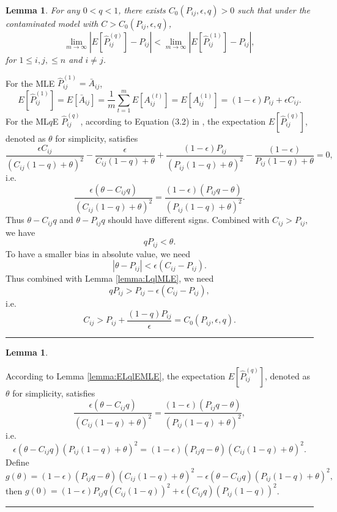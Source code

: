 \documentclass[a4paper]{article}
\newenvironment{proof}{{\bf Proof:  }}{\hfill\rule{2mm}{2mm}}
\newtheorem{lemma}[fact]{Lemma}
\begin{document}
\begin{lemma}%
For any $0 < q < 1$, there exists $C_0(P_{ij}, \epsilon, q) > 0$ such that under the contaminated model with $C > C_0(P_{ij}, \epsilon, q)$,
\[
	\lim_{m \to \infty} \left| E[\hat{P}^{(q)}_{ij}] - P_{ij} \right| < 
    \lim_{m \to \infty} \left| E[\hat{P}^{(1)}_{ij}] - P_{ij} \right|,
\]
for $1 \le i, j, \le n$ and $i \ne j$.
\end{lemma}
\label{lemma:ELqlEMLE}
\begin{proof}
For the MLE $\hat{P}^{(1)}_{ij} = \bar{A}_{ij}$,
\[
	E[\hat{P}^{(1)}_{ij}] = E[\bar{A}_{ij}]
    = \frac{1}{m} \sum_{t = 1}^m E[A_{ij}^{(t)}]
    = E[A_{ij}^{(1)}]
    = (1-\epsilon) P_{ij} + \epsilon C_{ij}.
\]
For the ML$q$E $\hat{P}^{(q)}_{ij}$, according to Equation (3.2) in \cite{ferrari2010}, the expectation $E[\hat{P}^{(q)}_{ij}]$, denoted as $\theta$ for simplicity, satisfies
\[
\frac{\epsilon C_{ij}}{(C_{ij}(1-q) + \theta)^2} - \frac{\epsilon}{C_{ij}(1-q) + \theta}
+\frac{(1-\epsilon) P_{ij}}{(P_{ij}(1-q) + \theta)^2} - \frac{(1-\epsilon)}{P_{ij}(1-q) + \theta}
= 0,
\]
i.e.
\[
\frac{\epsilon (\theta - C_{ij}q)}{(C_{ij}(1-q) + \theta)^2} =
\frac{(1-\epsilon) (P_{ij} q - \theta)}{(P_{ij}(1-q) + \theta)^2}.
\]
Thus $\theta - C_{ij} q$ and $\theta - P_{ij} q$ should have different signs. Combined with $C_{ij} > P_{ij}$, we have
\[
q P_{ij} < \theta.
\]
To have a smaller bias in absolute value, we need
\[
|\theta - P_{ij}| < \epsilon (C_{ij} - P_{ij}).
\]
Thus combined with Lemma \ref{lemma:LqlMLE}, we need
\[
q P_{ij} > P_{ij} - \epsilon(C_{ij} - P_{ij}),
\]
i.e.
\[
C_{ij} > P_{ij} + \frac{(1-q) P_{ij}}{\epsilon} = C_0(P_{ij}, \epsilon, q).
\]
\end{proof}




\begin{lemma}

\end{lemma}
\begin{proof}
According to Lemma \ref{lemma:ELqlEMLE}, the expectation $E[\hat{P}^{(q)}_{ij}]$, denoted as $\theta$ for simplicity, satisfies
\[
\frac{\epsilon (\theta - C_{ij}q)}{(C_{ij}(1-q) + \theta)^2} =
\frac{(1-\epsilon) (P_{ij} q - \theta)}{(P_{ij}(1-q) + \theta)^2},
\]
i.e.
\[
\epsilon (\theta - C_{ij}q) (P_{ij}(1-q) + \theta)^2 =
(1-\epsilon) (P_{ij} q - \theta) (C_{ij}(1-q) + \theta)^2.
\]
Define
\[
	g(\theta) = (1-\epsilon) (P_{ij} q - \theta) (C_{ij}(1-q) + \theta)^2 - \epsilon (\theta - C_{ij}q) (P_{ij}(1-q) + \theta)^2,
\]
then $g(0) = (1-\epsilon) P_{ij} q (C_{ij}(1-q))^2 + \epsilon ( C_{ij}q) (P_{ij}(1-q))^2$.
\end{proof}
\end{document}
